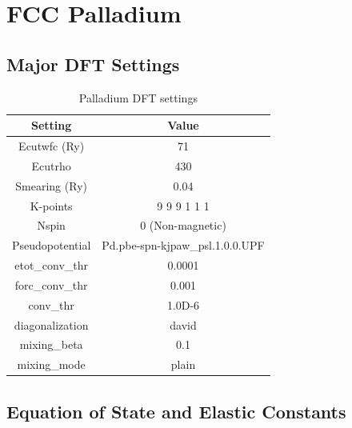 
\clearpage
\FloatBarrier
\section{FCC Palladium}

\FloatBarrier
\subsection{Major DFT Settings}

\begin{table}[h]
\begin{center}
\renewcommand{\arraystretch}{1.2}
\begin{tabular}{c c}
\hline\hline
Setting & Value \\
\hline\hline
Ecutwfc (Ry) & 71 \\
Ecutrho & 430 \\
Smearing (Ry) & 0.04 \\
K-points &  9 9 9 1 1 1   \\
Nspin &   0  (Non-magnetic)  \\
Pseudopotential &   Pd.pbe-spn-kjpaw\_psl.1.0.0.UPF    \\
etot\_conv\_thr & 0.0001 \\
forc\_conv\_thr & 0.001 \\ 
conv\_thr & 1.0D-6 \\ 
diagonalization & david \\ 
mixing\_beta & 0.1 \\ 
mixing\_mode & plain \\ 
\hline\hline
\end{tabular}
\end{center}
\caption{Palladium DFT settings}
\label{table:pdfccdftsettings}
\end{table}


\FloatBarrier
\subsection{Equation of State and Elastic Constants}

